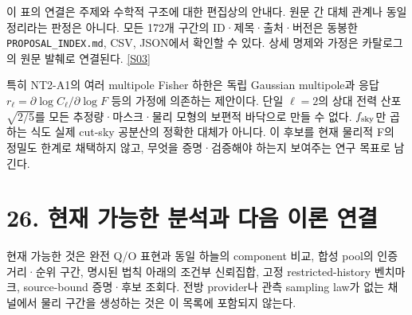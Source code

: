 \documentclass[11pt,a4paper]{article}
\begin{document}
이 표의 연결은 주제와 수학적 구조에 대한 편집상의 안내다. 원문 간 대체 관계나 동일 정리라는 판정은 아니다. 모든 172개 구간의 ID·제목·출처·버전은 동봉한 \texttt{PROPOSAL\_INDEX.md}, CSV, JSON에서 확인할 수 있다. 상세 명제와 가정은 카탈로그의 원문 발췌로 연결된다. \hyperlink{src:S03}{[S03]}


특히 NT2-A1의 여러 multipole Fisher 하한은 독립 Gaussian multipole과 응답 \(r_\ell=\partial\log C_\ell/\partial\log F\) 등의 가정에 의존하는 제안이다. 단일 \(\ell=2\)의 상대 전력 산포 \(\sqrt{2/5}\)를 모든 추정량·마스크·물리 모형의 보편적 바닥으로 만들 수 없다. \(f_{\rm sky}\)만 곱하는 식도 실제 cut-sky 공분산의 정확한 대체가 아니다. 이 후보를 현재 물리적 F의 정밀도 한계로 채택하지 않고, 무엇을 증명·검증해야 하는지 보여주는 연구 목표로 남긴다.


\hypertarget{s26}{}

\section*{26. 현재 가능한 분석과 다음 이론 연결}


현재 가능한 것은 완전 Q/O 표현과 동일 하늘의 component 비교, 합성 pool의 인증 거리·순위 구간, 명시된 법칙 아래의 조건부 신뢰집합, 고정 restricted-history 벤치마크, source-bound 증명·후보 조회다. 전방 provider나 관측 sampling law가 없는 채널에서 물리 구간을 생성하는 것은 이 목록에 포함되지 않는다.
\end{document}
